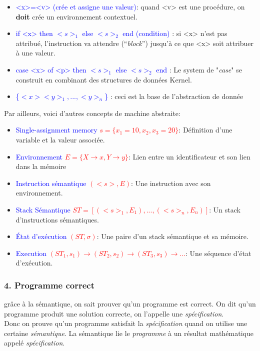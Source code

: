 \documentclass{report}
\begin{document}
\begin{itemize}
\item \textcolor{blue}{<x>=<v> (crée et assigne une valeur)}: quand <v> est une procédure, on \textbf{doit} crée un environnement contextuel.
\item \textcolor{blue}{if <x> then $<s>_1$ else $<s>_2$ end (condition)} : si <x> n'est pas attribué, l'instruction va attendre (“\textit{block}”) jusqu'à ce que <x> soit attribuer à une valeur.
\item \textcolor{blue}{case <x> of <p> then $<s>_1$ else $<s>_2$ end} : Le system de "\textit{case}" se construit en combinant des structures de données Kernel.
\item \textcolor{blue}{\{$<x> <y>_1, ..., <y>_n$\}} : ceci est la base de l'abstraction de donnée
\end{itemize}
Par ailleurs, voici d'autres concepts de machine abstraite:
\begin{itemize}
\item \textcolor{blue}{Single-assignment memory }\textcolor{red}{$s = \{x_1=10, x_2, x_3=20\}$}: Définition d'une variable et la valeur associée.
\item \textcolor{blue}{Environnement }\textcolor{red}{$E = \{X \rightarrow x, Y \rightarrow y\}$}: Lien entre un identificateur et son lien dans la mémoire
\item \textcolor{blue}{Instruction sémantique }\textcolor{red}{$(<s>, E)$}: Une instruction avec son environnement.
\item \textcolor{blue}{Stack Sémantique }\textcolor{red}{$ST = [(<s>_1,E_1), ..., (<s>_n,E_n)]$}: Un stack d'instructions sémantiques.
\item \textcolor{blue}{État d'exécution }\textcolor{red}{$(ST,\sigma)$}: Une paire d'un stack sémantique et sa mémoire.
\item \textcolor{blue}{Execution }\textcolor{red}{$(ST_1,s_1) \rightarrow (ST_2,s_2) \rightarrow (ST_3,s_3) \rightarrow ...$}: Une séquence d'état d'exécution. 
\end{itemize}

\subsubsection{4. Programme correct}
grâce à la sémantique, on sait prouver qu'un programme est correct. On dit qu'un programme produit une solution correcte, on l'appelle une \textit{spécification}.\\
Donc on prouve qu'un programme satisfait la \textit{spécification} quand on utilise une certaine \textit{sémantique}. La sémantique lie le \textit{programme} à un résultat mathématique appelé \textit{spécification}.\\
\end{document}
